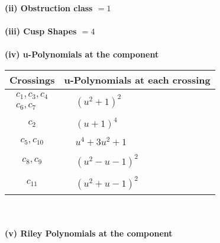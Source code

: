 \documentclass[1p]{elsarticle_modified}
\theoremstyle{definition}
\begin{document}
\flushleft \textbf{(ii) Obstruction class $= 1$}\\~\\
\flushleft \textbf{(iii) Cusp Shapes $= 4$}\\~\\
\newpage\renewcommand{\arraystretch}{1}
\flushleft \textbf{(iv) u-Polynomials at the component}\newline \\
\begin{tabular}{m{50pt}|m{274pt}}
Crossings & \hspace{64pt}u-Polynomials at each crossing \\
\hline $$\begin{aligned}c_{1},c_{3},c_{4}\\c_{6},c_{7}\end{aligned}$$&$\begin{aligned}
&(u^2+1)^2
\end{aligned}$\\
\hline $$\begin{aligned}c_{2}\end{aligned}$$&$\begin{aligned}
&(u+1)^4
\end{aligned}$\\
\hline $$\begin{aligned}c_{5},c_{10}\end{aligned}$$&$\begin{aligned}
&u^4+3 u^2+1
\end{aligned}$\\
\hline $$\begin{aligned}c_{8},c_{9}\end{aligned}$$&$\begin{aligned}
&(u^2- u-1)^2
\end{aligned}$\\
\hline $$\begin{aligned}c_{11}\end{aligned}$$&$\begin{aligned}
&(u^2+u-1)^2
\end{aligned}$\\
\hline
\end{tabular}\\~\\
\newpage\renewcommand{\arraystretch}{1}
\flushleft \textbf{(v) Riley Polynomials at the component}\newline \\
\end{document}
